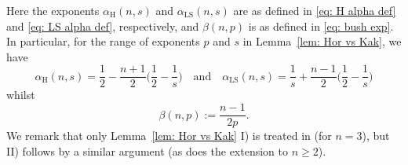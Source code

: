 \documentclass[reqno]{amsart}
\numberwithin{equation}{section}
\theoremstyle{plain}
\theoremstyle{definition}
\begin{document}
Here the exponents $\alpha_{\mathrm{H}}(n,s)$ and $\alpha_{\mathrm{LS}}(n,s)$ are as defined in \eqref{eq: H alpha def} and \eqref{eq: LS alpha def}, respectively, and $\beta(n,p)$ is as defined in \eqref{eq: bush exp}. In particular, for the range of exponents $p$ and $s$ in Lemma~\ref{lem: Hor vs Kak}, we have
\begin{equation}\label{eq: alpha def}
    \alpha_{\mathrm{H}}(n, s) = \frac{1}{2} -\frac{n+1}{2}\Big(\frac{1}{2} - \frac{1}{s}\Big)  \quad \textrm{and} \quad \alpha_{\mathrm{LS}}(n, s) = \frac{1}{s} + \frac{n-1}{2}\Big(\frac{1}{2} - \frac{1}{s}\Big)
\end{equation}
whilst
\begin{equation*}
    \beta(n, p) := \frac{n-1}{2p}.
\end{equation*}
We remark that only Lemma~\ref{lem: Hor vs Kak} I) is treated in \cite{Bourgain1991} (for $n=3$), but II) follows by a similar argument (as does the extension to $n \geq 2$). 
\end{document}
